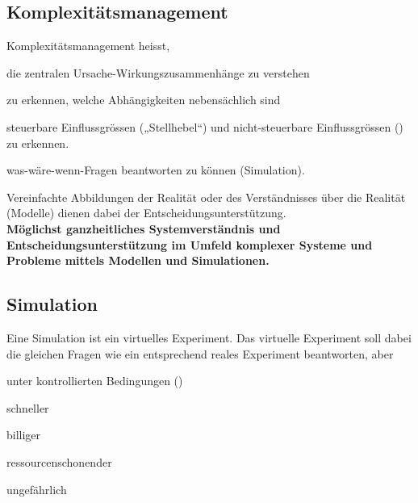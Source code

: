 \subsection{Komplexitätsmanagement}
Komplexitätsmanagement heisst,
\begin{compactitem}
	\item die zentralen Ursache-Wirkungszusammenhänge zu verstehen
	\item zu erkennen, welche Abhängigkeiten nebensächlich sind
	\item steuerbare Einflussgrössen („Stellhebel“) und nicht-steuerbare Einflussgrössen () zu erkennen.
	\item was-wäre-wenn-Fragen beantworten zu können (Simulation).
\end{compactitem}
Vereinfachte Abbildungen der Realität oder des Verständnisses über die Realität (Modelle) dienen dabei der Entscheidungsunterstützung. \\
\textbf{Möglichst ganzheitliches Systemverständnis und Entscheidungsunterstützung im Umfeld komplexer Systeme und Probleme mittels Modellen und Simulationen.}

\subsection{Simulation}
Eine Simulation ist ein virtuelles Experiment. Das virtuelle Experiment soll dabei die gleichen Fragen wie
ein entsprechend reales Experiment beantworten, aber
\begin{multicols}{3}
	\begin{compactitem}
		\item unter kontrollierten Bedingungen ()
		\item schneller
		\item billiger 
		\item ressourcenschonender
		\item ungefährlich
	\end{compactitem}
\end{multicols}